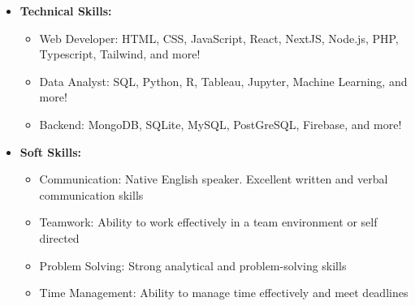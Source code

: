 
\begin{itemize}
  \item \textbf{Technical Skills:}
  \begin{itemize}
    \item Web Developer: HTML, CSS, JavaScript, React, NextJS, Node.js, PHP, Typescript, Tailwind, and more!
    \item Data Analyst: SQL, Python, R, Tableau, Jupyter, Machine Learning, and more!
    \item Backend: MongoDB, SQLite, MySQL, PostGreSQL, Firebase, and more!
  \end{itemize}
  \item \textbf{Soft Skills:}
    \begin{itemize}
      \item Communication: Native English speaker. Excellent written and verbal communication skills
      \item Teamwork: Ability to work effectively in a team environment or self directed
      \item Problem Solving: Strong analytical and problem-solving skills
      \item Time Management: Ability to manage time effectively and meet deadlines
    \end{itemize}
\end{itemize}

